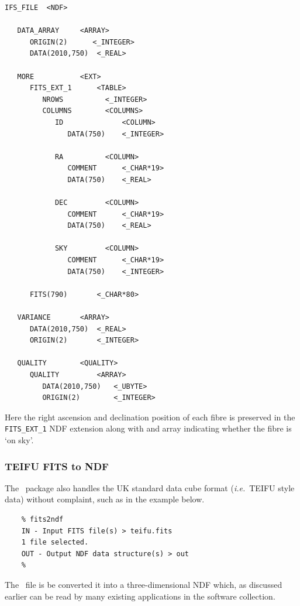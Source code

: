 \documentclass[twoside,11pt]{article}
\newcommand{\htmlref}[2]{#1}
\newcommand{\xref}[3]{#1}
\begin{document}
\small\begin{verbatim}
IFS_FILE  <NDF>

   DATA_ARRAY     <ARRAY>
      ORIGIN(2)      <_INTEGER>
      DATA(2010,750)  <_REAL>

   MORE           <EXT>
      FITS_EXT_1      <TABLE>
         NROWS          <_INTEGER>
         COLUMNS        <COLUMNS>
            ID              <COLUMN>
               DATA(750)    <_INTEGER>

            RA          <COLUMN>
               COMMENT      <_CHAR*19>
               DATA(750)    <_REAL>

            DEC         <COLUMN>
               COMMENT      <_CHAR*19>
               DATA(750)    <_REAL>

            SKY         <COLUMN>
               COMMENT      <_CHAR*19>
               DATA(750)    <_INTEGER> 

      FITS(790)       <_CHAR*80>

   VARIANCE       <ARRAY> 
      DATA(2010,750)  <_REAL>
      ORIGIN(2)       <_INTEGER>

   QUALITY        <QUALITY>
      QUALITY         <ARRAY>
         DATA(2010,750)   <_UBYTE>
         ORIGIN(2)        <_INTEGER>
\end{verbatim}\normalsize

Here the right ascension and declination position of each fibre is preserved in the
{\tt FITS\_EXT\_1} NDF extension along with and array indicating
whether the fibre is `on sky'.

\subsubsection{TEIFU FITS to NDF}

The \CONVERTref\ package also handles the UK standard data
cube format (\emph{i.e.}\ TEIFU style data) without complaint, such as
in the example below.

\begin{verbatim}
    % fits2ndf
    IN - Input FITS file(s) > teifu.fits
    1 file selected.
    OUT - Output NDF data structure(s) > out
    % 
\end{verbatim}

The \FITSref\ file is be converted it into a three-dimensional
\xref{NDF}{sun33}{} which, as \htmlref{discussed
earlier}{sc16_teifufile} can be read by many existing
applications in the software collection.
\end{document}
